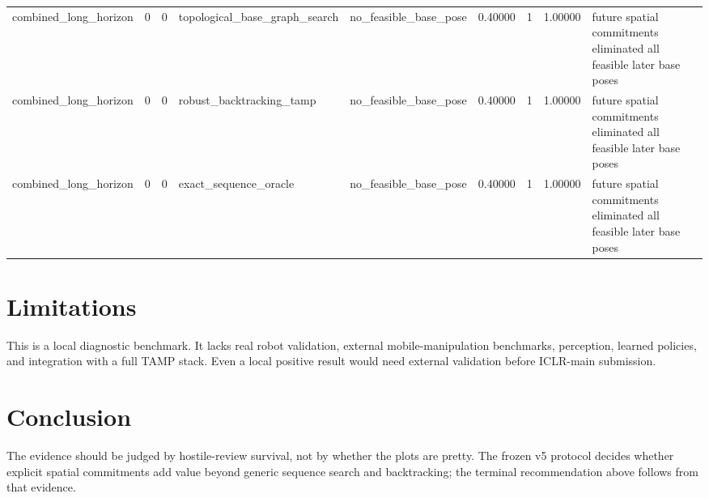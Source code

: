 \documentclass{article}
\begin{document}
\begin{table}[tbp]
{\begin{tabular}{lllllllll}
combined\_long\_horizon & 0 & 0 & topological\_base\_graph\_search & no\_feasible\_base\_pose & 0.40000 & 1 & 1.00000 & future spatial commitments eliminated all feasible later base poses \\
combined\_long\_horizon & 0 & 0 & robust\_backtracking\_tamp & no\_feasible\_base\_pose & 0.40000 & 1 & 1.00000 & future spatial commitments eliminated all feasible later base poses \\
combined\_long\_horizon & 0 & 0 & exact\_sequence\_oracle & no\_feasible\_base\_pose & 0.40000 & 1 & 1.00000 & future spatial commitments eliminated all feasible later base poses \\
\bottomrule
\end{tabular}
}
\end{table}

\section{Limitations}
This is a local diagnostic benchmark. It lacks real robot validation, external mobile-manipulation benchmarks, perception, learned policies, and integration with a full TAMP stack. Even a local positive result would need external validation before ICLR-main submission.

\section{Conclusion}
The evidence should be judged by hostile-review survival, not by whether the plots are pretty. The frozen v5 protocol decides whether explicit spatial commitments add value beyond generic sequence search and backtracking; the terminal recommendation above follows from that evidence.

\clearpage
\appendix
\end{document}
